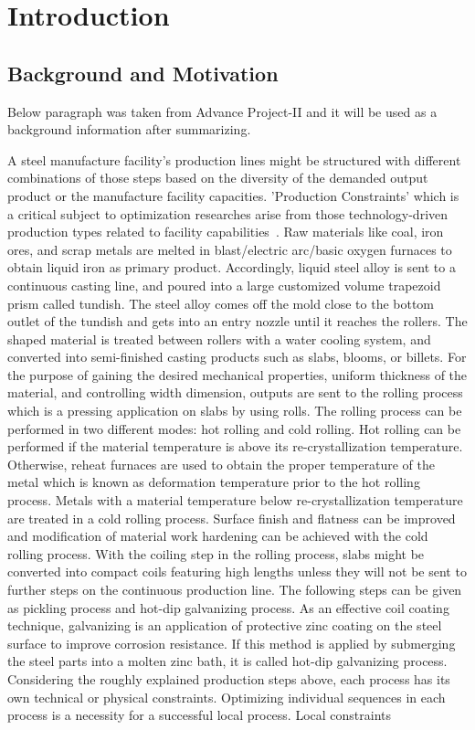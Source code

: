 \chapter{Introduction}

\section{Background and Motivation}
{\color{red} 
	
	Below paragraph was taken from Advance Project-II and it will be used as a background information after summarizing.
	
	
	
	A steel manufacture facility's production lines might be structured with different combinations of those steps based on the diversity of the demanded output product or the manufacture facility capacities. 'Production Constraints' which is a critical subject to optimization researches arise from those technology-driven production types related to facility capabilities~\cite{cowling2001design}. Raw materials like coal, iron ores, and scrap metals are melted in blast/electric arc/basic oxygen furnaces to obtain liquid iron as primary product. Accordingly, liquid steel alloy is sent to a continuous casting line, and poured into a large customized volume trapezoid prism called tundish. The steel alloy comes off the mold close to the bottom outlet of the tundish and gets into an entry nozzle until it reaches the rollers. The shaped material is treated between rollers with a water cooling system, and converted into semi-finished casting products such as slabs, blooms, or billets. For the purpose of gaining the desired mechanical properties, uniform thickness of the material, and controlling width dimension, outputs are sent to the rolling process which is a pressing application on slabs by using rolls. The rolling process can be performed in two different modes: hot rolling and cold rolling. Hot rolling can be performed if the material temperature is above its re-crystallization temperature. Otherwise, reheat furnaces are used to obtain the proper temperature of the metal which is known as deformation temperature prior to the hot rolling process. Metals with a material temperature below re-crystallization temperature are treated in a cold rolling process. Surface finish and flatness can be improved and modification of material work hardening can be achieved with the cold rolling process. With the coiling step in the rolling process, slabs might be converted into compact coils featuring high lengths unless they will not be sent to further steps on the continuous production line. The following steps can be given as pickling process and hot-dip galvanizing process. As an effective coil coating technique, galvanizing is an application of protective zinc coating on the steel surface to improve corrosion resistance. If this method is applied by submerging the steel parts into a molten zinc bath, it is called hot-dip galvanizing process. Considering the roughly explained production steps above, each process has its own technical or physical constraints. Optimizing individual sequences in each process is a necessity for a successful local process. Local constraints }
